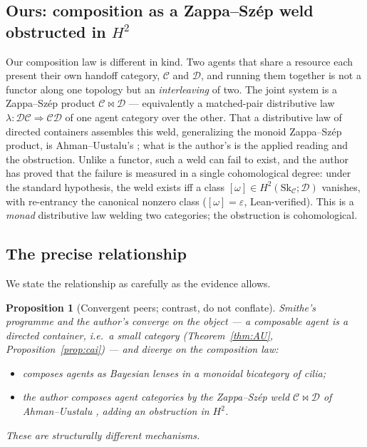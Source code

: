 \documentclass[11pt]{amsart}
\theoremstyle{plain}
\newtheorem{proposition}[theorem]{Proposition}
\theoremstyle{definition}
\newcommand{\C}{\mathcal{C}}
\newcommand{\D}{\mathcal{D}}
\newcommand{\dir}{\mathcal{D}}
\newcommand{\Sk}{\mathrm{Sk}}
\begin{document}
\subsection*{Ours: composition as a Zappa--Sz\'ep weld obstructed in $H^2$}
Our composition law is different in kind. Two agents that share a resource each present their own
handoff category, $\C$ and $\D$, and running them together is not a functor along one topology but
an \emph{interleaving} of two. The joint system is a Zappa--Sz\'ep product $\C\bowtie\D$ ---
equivalently a matched-pair distributive law $\lambda\colon\D\C\Rightarrow\C\D$ of one agent
category over the other. That a distributive law of directed containers assembles this weld,
generalizing the monoid Zappa--Sz\'ep product, is Ahman--Uustalu's \cite{AhmanUustaluDL}; what
is the author's is the applied reading and the obstruction. Unlike a functor, such a weld can
fail to exist, and the author has
proved that the failure is measured in a single cohomological degree: under the standard
hypothesis, the weld exists iff a class $[\omega]\in H^2(\Sk_\C;\dir)$ vanishes, with re-entrancy
the canonical nonzero class ($[\omega]=\varepsilon$, Lean-verified). This is a \emph{monad}
distributive law welding two categories; the obstruction is cohomological.

\subsection*{The precise relationship}
We state the relationship as carefully as the evidence allows.

\begin{proposition}[Convergent peers; contrast, do not conflate]\label{prop:contrast}
Smithe's programme and the author's converge on the object --- a composable agent is a directed
container, i.e.\ a small category (Theorem~\ref{thm:AU}, Proposition~\ref{prop:cai}) --- and
diverge on the composition law:
\begin{itemize}
\item[(i)] \cite{SmitheCAI2} composes agents as Bayesian lenses in a monoidal bicategory of cilia;
\item[(ii)] the author composes agent \emph{categories} by the Zappa--Sz\'ep weld $\C\bowtie\D$
of Ahman--Uustalu \cite{AhmanUustaluDL}, adding an obstruction in $H^2$.
\end{itemize}
These are structurally different mechanisms.
\end{proposition}
\end{document}
